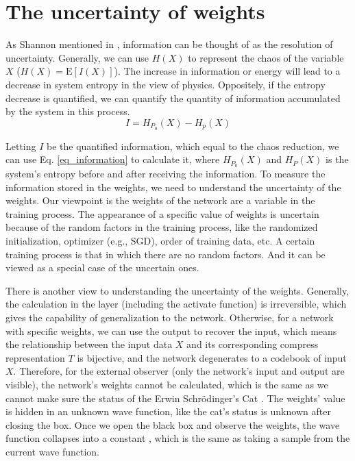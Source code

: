 \documentclass[letterpaper]{article} %
\begin{document}
\section{The uncertainty of weights}
As Shannon mentioned in \cite{shannon1948mathematical}, information can be thought of as the resolution of uncertainty. Generally, we can use $H(X)$ to represent the chaos of the variable $X$ ($H(X)=\mathrm{E}[I(X)]$). The increase in information or energy will lead to a decrease in system entropy in the view of physics. Oppositely, if the entropy decrease is quantified, we can quantify the quantity of information accumulated by the system in this process.
\begin{equation}
    I = H_{P_0}(X) - H_p(X)
    \label{eq_information}
\end{equation}

Letting $I$ be the quantified information, which equal to the chaos reduction, we can use Eq. \ref{eq_information} to calculate it, where $H_{P_0}(X)$ and $H_{P}(X)$ is the system's entropy before and after receiving the information. To measure the information stored in the weights, we need to understand the uncertainty of the weights. Our viewpoint is the weights of the network are a variable in the training process. The appearance of a specific value of weights is uncertain because of the random factors in the training process, like the randomized initialization, optimizer (e.g., SGD), order of training data, etc. A certain training process is that in which there are no random factors. And it can be viewed as a special case of the uncertain ones.

There is another view to understanding the uncertainty of the weights. Generally, the calculation in the layer (including the activate function) is irreversible, which gives the capability of generalization to the network. Otherwise, for a network with specific weights, we can use the output to recover the input, which means the relationship between the input data $X$ and its corresponding compress representation $T$ is bijective, and the network degenerates to a codebook of input $X$. Therefore, for the external observer (only the network's input and output are visible), the network's weights cannot be calculated, which is the same as we cannot make sure the status of the Erwin Schrödinger's Cat \cite{marshall1997s}. The weights' value is hidden in an unknown wave function, like the cat's status is unknown after closing the box. Once we open the black box and observe the weights, the wave function collapses into a constant \cite{von2018mathematical}, which is the same as taking a sample from the current wave function.
\end{document}

